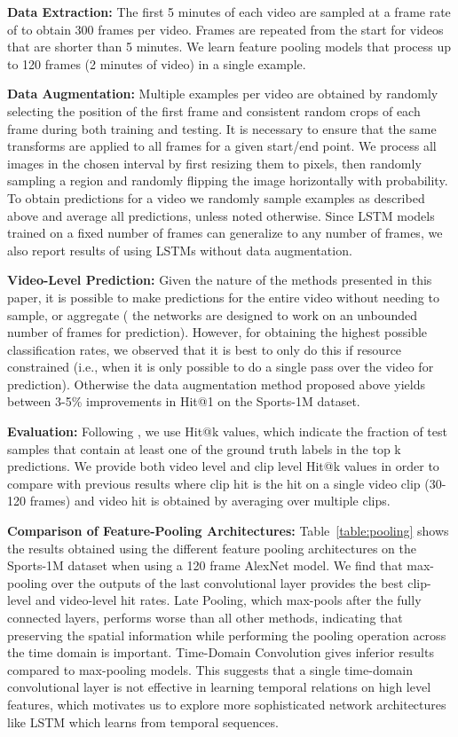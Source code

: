 \documentclass[10pt,twocolumn,letterpaper]{article}
\begin{document}
\textbf{Data Extraction:} The first 5 minutes of each video are sampled
at a frame rate of  to obtain 300 frames per video.
Frames are repeated from the start for videos that are shorter than 5 minutes.
We learn feature pooling models that process up to 120 frames (2 minutes of
video) in a single example.

\textbf{Data Augmentation:} Multiple examples per video are obtained by
randomly selecting the position of the first frame and consistent random crops of each
frame during both training and testing. It is necessary to ensure that the same transforms
are applied to all frames for a given start/end point. We process all images in the
chosen interval by first resizing them to  pixels, then randomly
sampling a  region and randomly flipping the image horizontally
with  probability. To obtain predictions for a video we randomly sample
 examples as described above and average all predictions, unless noted otherwise.
Since LSTM models trained on a fixed number of frames can generalize to any number of frames,
we also report results of using LSTMs without data augmentation.

\textbf{Video-Level Prediction:} Given the nature of the methods presented in this paper,
it is possible to make predictions for the entire video without needing to sample, or aggregate (
the networks are designed to work on an unbounded number of frames for prediction). However,
for obtaining the highest possible classification rates, we observed that it is best to only
do this if resource constrained (i.e., when it is only possible to do a single pass over the
video for prediction). Otherwise the data augmentation method proposed above yields between 3-5\%
improvements in Hit@1 on the Sports-1M dataset.

\textbf{Evaluation:} Following \cite{karpathy2014large}, we use Hit@k values, which indicate the fraction of test
 samples that contain at least one of the ground truth labels in the top k predictions. We provide both video level
and clip level Hit@k values in order to compare with previous results where clip hit is the hit on a single video clip
 (30-120 frames) and video hit is obtained by averaging over multiple clips.



\textbf{Comparison of Feature-Pooling Architectures:}
Table~\ref{table:pooling} shows the results obtained using the
different feature pooling architectures on the Sports-1M dataset when
using a 120 frame AlexNet model. We find that max-pooling over the
outputs of the last convolutional layer provides the best clip-level
and video-level hit rates. Late Pooling, which max-pools after the
fully connected layers, performs worse than all other methods,
indicating that preserving the spatial information while performing
the pooling operation across the time domain is important.
Time-Domain Convolution gives inferior results compared to max-pooling models.
This suggests that a single time-domain convolutional layer is not effective in learning
temporal relations on high level features, which motivates us to explore more sophisticated
network architectures like LSTM which learns from temporal sequences.
\end{document}
